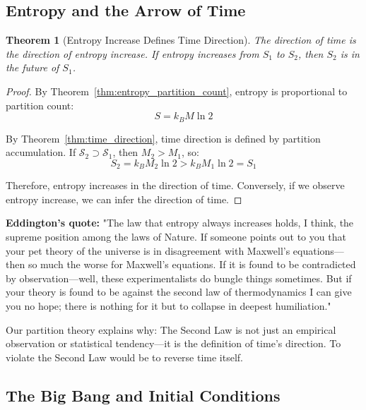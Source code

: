 \documentclass[twocolumn,10pt]{article}
\newtheorem{theorem}{Theorem}[section]
\theoremstyle{definition}
\theoremstyle{remark}
\begin{document}
\subsection{Entropy and the Arrow of Time}

\begin{theorem}[Entropy Increase Defines Time Direction]
\label{thm:entropy_time_direction}
The direction of time is the direction of entropy increase. If entropy increases from $S_1$ to $S_2$, then $S_2$ is in the future of $S_1$.
\end{theorem}

\begin{proof}
By Theorem~\ref{thm:entropy_partition_count}, entropy is proportional to partition count:
\begin{equation}
S = k_B M \ln 2
\end{equation}

By Theorem~\ref{thm:time_direction}, time direction is defined by partition accumulation. If $\mathcal{S}_2 \supset \mathcal{S}_1$, then $M_2 > M_1$, so:
\begin{equation}
S_2 = k_B M_2 \ln 2 > k_B M_1 \ln 2 = S_1
\end{equation}

Therefore, entropy increases in the direction of time. Conversely, if we observe entropy increase, we can infer the direction of time.
\end{proof}

\noindent\textbf{Eddington's quote\cite{eddington1928}:} "The law that entropy always increases holds, I think, the supreme position among the laws of Nature. If someone points out to you that your pet theory of the universe is in disagreement with Maxwell's equations—then so much the worse for Maxwell's equations. If it is found to be contradicted by observation—well, these experimentalists do bungle things sometimes. But if your theory is found to be against the second law of thermodynamics I can give you no hope; there is nothing for it but to collapse in deepest humiliation."

\vspace{0.2cm}
\noindent Our partition theory explains why: The Second Law is not just an empirical observation or statistical tendency—it is the definition of time's direction. To violate the Second Law would be to reverse time itself.

\subsection{The Big Bang and Initial Conditions}
\end{document}
